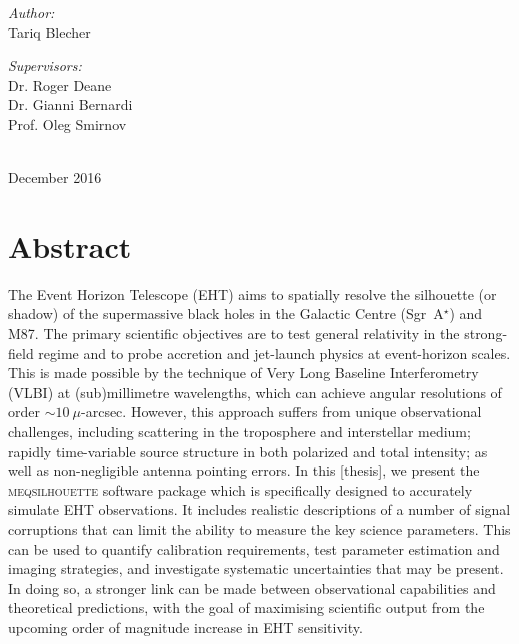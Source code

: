 \begin{titlepage}
\begin{minipage}{0.45\textwidth}
\begin{flushleft}\large 
\emph{Author:} \\
Tariq  {\sc Blecher}\\
\end{flushleft}
\end{minipage}
\begin{minipage}{0.45\textwidth}

\begin{flushright} \large
\emph{Supervisors:} \\
Dr. Roger {\sc Deane} \\
Dr. Gianni {\sc Bernardi} \\
Prof. Oleg {\sc Smirnov} \\
\end{flushright}
\end{minipage}\\[2cm]


{\large December 2016}

\end{titlepage}

\chapter*{Abstract} 

The Event Horizon Telescope (EHT) aims to spatially resolve the silhouette (or shadow) of the supermassive black holes in the Galactic Centre (Sgr~A$^\star$) and M87. The primary scientific objectives are to test general relativity in the strong-field regime and to probe accretion and jet-launch physics at event-horizon scales. This is made possible by the technique of Very Long Baseline Interferometry (VLBI) at (sub)millimetre wavelengths, which can achieve angular resolutions of order $\sim10~\mu$-arcsec. However, this approach suffers from unique observational challenges, including scattering in the troposphere and interstellar medium; rapidly time-variable source structure in both polarized and total intensity; as well as non-negligible antenna pointing errors. In this [thesis], we present the \textsc{meqsilhouette} software package which is specifically designed to accurately simulate EHT observations. It includes realistic descriptions of a number of signal corruptions that can limit the ability to measure the key science parameters. This can be used to quantify calibration requirements, test parameter estimation and imaging strategies, and investigate systematic uncertainties that may be present. In doing so, a stronger link can be made between observational capabilities and theoretical predictions, with the goal of maximising scientific output from the upcoming order of magnitude increase in EHT sensitivity. 

